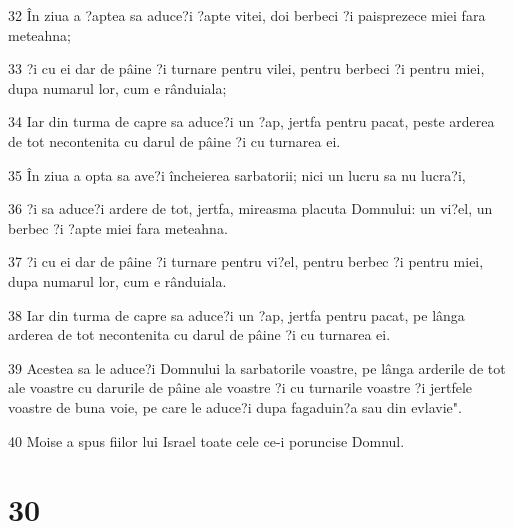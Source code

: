 \par 32 În ziua a ?aptea sa aduce?i ?apte vitei, doi berbeci ?i paisprezece miei fara meteahna;
\par 33 ?i cu ei dar de pâine ?i turnare pentru vilei, pentru berbeci ?i pentru miei, dupa numarul lor, cum e rânduiala;
\par 34 Iar din turma de capre sa aduce?i un ?ap, jertfa pentru pacat, peste arderea de tot necontenita cu darul de pâine ?i cu turnarea ei.
\par 35 În ziua a opta sa ave?i încheierea sarbatorii; nici un lucru sa nu lucra?i,
\par 36 ?i sa aduce?i ardere de tot, jertfa, mireasma placuta Domnului: un vi?el, un berbec ?i ?apte miei fara meteahna.
\par 37 ?i cu ei dar de pâine ?i turnare pentru vi?el, pentru berbec ?i pentru miei, dupa numarul lor, cum e rânduiala.
\par 38 Iar din turma de capre sa aduce?i un ?ap, jertfa pentru pacat, pe lânga arderea de tot necontenita cu darul de pâine ?i cu turnarea ei.
\par 39 Acestea sa le aduce?i Domnului la sarbatorile voastre, pe lânga arderile de tot ale voastre cu darurile de pâine ale voastre ?i cu turnarile voastre ?i jertfele voastre de buna voie, pe care le aduce?i dupa fagaduin?a sau din evlavie".
\par 40 Moise a spus fiilor lui Israel toate cele ce-i poruncise Domnul.

\chapter{30}

